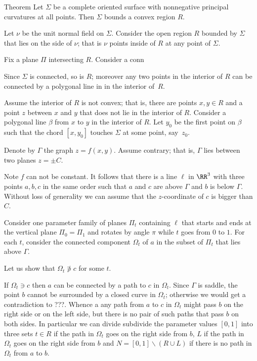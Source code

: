 \begin{thm}{Theorem}
Let $\Sigma$ be a complete oriented surface with 
nonnegative principal curvatures at all points.
Then $\Sigma$ bounds a convex region $R$.
\end{thm}

Let $\nu$ be the unit normal field on $\Sigma$.
Consider the open region $R$ bounded by $\Sigma$ that lies on the side of $\nu$;
that is $\nu$ points inside of $R$ at any point of $\Sigma$.

Fix a plane $\Pi$ intersecting $R$.
Consider a conn

Since $\Sigma$ is connected, so is $R$;
moreover any two points in the interior of $R$ can be connected by a polygonal line in in the interior of~$R$.

Assume the interior of $R$ is not convex; that is, there are points $x,y\in R$ and a point $z$ between $x$ and $y$ that does not lie in the interior of $R$.
Consider a polygonal  line $\beta$ from $x$ to $y$ in the interior of $R$.
Let $y_0$ be the first point on $\beta$ such that the chord $[x,y_0]$ touches $\Sigma$ at some point, say~$z_0$.

\qeds












Denote by $\Gamma$ the graph $z=f(x,y)$.
Assume contrary; that is, $\Gamma$ lies between two planes $z=\pm C$.

Note $f$ can not be constant.
It follows that there is a line $\ell$ in $\RR^3$ with three points $a,b,c$ in the same order such that 
$a$ and $c$ are above $\Gamma$ and $b$ is below $\Gamma$.
Without loss of generality we can assume that the $z$-coordinate of $c$ is bigger than $C$.

Consider one parameter family of planes $\Pi_t$ containing $\ell$ that starts and ends at the vertical plane $\Pi_0=\Pi_1$ and rotates by angle $\pi$ while $t$ goes from $0$ to $1$.
For each $t$, consider the connected component $\Omega_t$ of $a$ in the subset of $\Pi_t$ that lies above $\Gamma$.

Let us show that $\Omega_t\not\ni c$ for some $t$.

If  $\Omega_t\ni c$ then $a$ can be connected by a path to $c$ in $\Omega_t$.
Since $\Gamma$ is saddle, the point $b$ cannot be surrounded by a closed curve in $\Omega_t$;
otherwise we would get a contradiction to ???.
Whence a any path from $a$ to $c$ in $\Omega_t$ might pass $b$ on the right side or on the left side,
but there is no pair of such paths that pass $b$ on both sides.
In particular we can divide subdivide the parameter values $[0,1]$ into three sets $t\in R$ if the path  in $\Omega_t$  goes on the right side from $b$,  $L$ if the path in $\Omega_t$ goes on the right side from $b$ and $N=[0,1]\backslash(R\cup L)$ if there is no path in $\Omega_t$ from $a$ to $b$.

